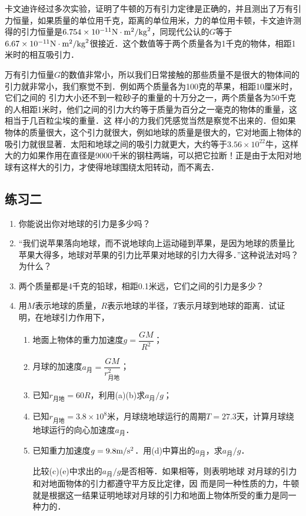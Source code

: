 卡文迪许经过多次实验，证明了牛顿的万有引力定律是正确的，并且测出了万有引力恒量，如果质量的单位用千克，距离的单位用米，力的单位用卡顿，卡文迪许测得的引力恒量是$6.754\times 10^{-11}{\rm N}\cdot {\rm m^2}/{\rm kg}^2$，同现代公认的$G$等于$6.67\times 10^{-11}{\rm N}\cdot {\rm m^2}/{\rm kg}^2$很接近．这个数值等于两个质量各为1千克的物体，相距1米时的相互吸引力．

万有引力恒量$G$的数值非常小，所以我们日常接触的那些质量不是很大的物体间的引力就非常小，我们察觉不到．例如两个质量各为100克的苹果，相距10厘米时，它们之间的
引力大小还不到一粒砂子的重量的十万分之一，两个质量各为50千克的人相距1米时，他们之间的引力大约等于质量为百分之一毫克的物体的重量，这相当于几百粒尘埃的重量．这
样小的力我们凭感觉当然是察觉不出来的．但如果物体的质量很大，这个引力就很大，例如地球的质量是很大的，它对地面上物体的吸引力就很显著．太阳和地球之间的吸引力就更大，大约等于$3.56\times 10^{22}$牛，这样大的力如果作用在直径是9000千米的钢柱两端，可以把它拉断！正是由于太阳对地球有这样大的引力，才使得地球围绕太阳转动，而不离去．

\subsection*{练习二}
\begin{enumerate}
	\item 你能说出你对地球的引力是多少吗？
\item “我们说苹果落向地球，而不说地球向上运动碰到苹果，是因为地球的质量比苹果大得多，地球对苹果的引力比苹果对地球的引力大得多．”这种说法对吗？为什么？
\item 两个质量都是4千克的铅球，相距0.1米远，它们之间的引力是多少？
\item 用$M$表示地球的质量，$R$表示地球的半径，$T$表示月球到地球的距离．试证明，在地球引力作用下，
\begin{enumerate}
	\item 地面上物体的重力加速度$g=\dfrac{GM}{R^2}$；
	\item 月球的加速度$a_{\text{月}}=\dfrac{GM}{r^2_{\text{月地}}}$；
	\item 已知$r_{\text{月地}}=60R$，利用(a)(b)求$a_{\text{月}}/g$；
	\item 已知$r_{\text{月地}}=3.8\times 10^8$米，月球绕地球运行的周期$T=27.3$天，计算月球绕地球运行的向心加速度$a_{\text{月}}$．
	\item 已知重力加速度$g=9.8\text{m}/\text{s}^2$．用(d)中算出的$a_{\text{月}}$，求$a_{\text{月}}/g$．
	
	比较(c)(e)中求出的$a_{\text{月}}/g$是否相等．如果相等，则表明地球
	对月球的引力和对地面物体的引力都遵守平方反比定律，因
	而是同一种性质的力，牛顿就是根据这一结果证明地球对月球的引力和地面上物体所受的重力是同一种力的．
\end{enumerate}
\end{enumerate}


